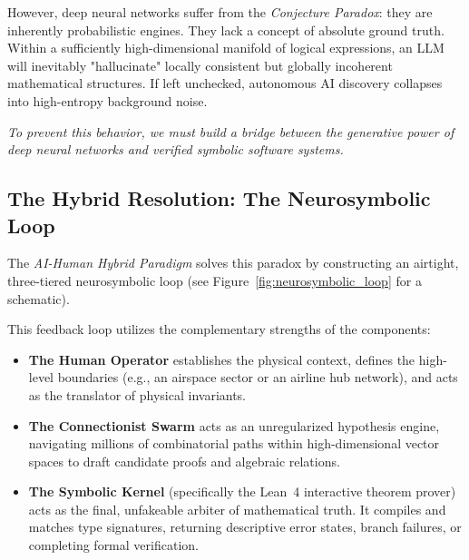 \documentclass[11pt,a4paper]{book}
\begin{document}
However, deep neural networks suffer from the \textit{Conjecture Paradox}: they are inherently probabilistic engines. They lack a concept of absolute ground truth. Within a sufficiently high-dimensional manifold of logical expressions, an LLM will inevitably "hallucinate" locally consistent but globally incoherent mathematical structures. If left unchecked, autonomous AI discovery collapses into high-entropy background noise.

\textit{To prevent this behavior, we must build a bridge between the generative power of deep neural networks and verified symbolic software systems.}

\subsection{The Hybrid Resolution: The Neurosymbolic Loop}
The \textit{AI-Human Hybrid Paradigm} solves this paradox by constructing an airtight, three-tiered neurosymbolic loop (see Figure~\ref{fig:neurosymbolic_loop} for a schematic).

This feedback loop utilizes the complementary strengths of the components:
\begin{itemize}
    \item \textbf{The Human Operator} establishes the physical context, defines the high-level boundaries (e.g., an airspace sector or an airline hub network), and acts as the translator of physical invariants.
    \item \textbf{The Connectionist Swarm} acts as an unregularized hypothesis engine, navigating millions of combinatorial paths within high-dimensional vector spaces to draft candidate proofs and algebraic relations.
    \item \textbf{The Symbolic Kernel} (specifically the Lean~4 interactive theorem prover) acts as the final, unfakeable arbiter of mathematical truth. It compiles and matches type signatures, returning descriptive error states, branch failures, or completing formal verification.
\end{itemize}
\end{document}
